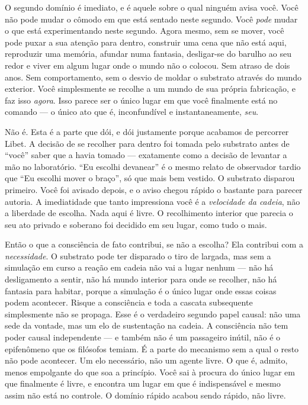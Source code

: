 \documentclass[11pt, twoside, openright]{book}
\begin{document}
O segundo domínio é imediato, e é aquele sobre o qual ninguém avisa você. Você não pode mudar o cômodo em que está sentado neste segundo. Você \textit{pode} mudar o que está experimentando neste segundo. Agora mesmo, sem se mover, você pode puxar a sua atenção para dentro, construir uma cena que não está aqui, reproduzir uma memória, afundar numa fantasia, desligar-se do barulho ao seu redor e viver em algum lugar onde o mundo não o colocou. Sem atraso de dois anos. Sem comportamento, sem o desvio de moldar o substrato através do mundo exterior. Você simplesmente se recolhe a um mundo de sua própria fabricação, e faz isso \textit{agora}. Isso parece ser o único lugar em que você finalmente está no comando --- o único ato que é, inconfundível e instantaneamente, \textit{seu}.

Não é. Esta é a parte que dói, e dói justamente porque acabamos de percorrer Libet. A decisão de se recolher para dentro foi tomada pelo substrato antes de ``você'' saber que a havia tomado --- exatamente como a decisão de levantar a mão no laboratório. ``Eu escolhi devanear'' é o mesmo relato de observador tardio que ``Eu escolhi mover o braço'', só que mais bem vestido. O substrato disparou primeiro. Você foi avisado depois, e o aviso chegou rápido o bastante para parecer autoria. A imediatidade que tanto impressiona você é a \textit{velocidade da cadeia}, não a liberdade de escolha. Nada aqui é livre. O recolhimento interior que parecia o seu ato privado e soberano foi decidido em seu lugar, como tudo o mais.

Então o que a consciência de fato contribui, se não a escolha? Ela contribui com a \textit{necessidade}. O substrato pode ter disparado o tiro de largada, mas sem a simulação em curso a reação em cadeia não vai a lugar nenhum --- não há desligamento a sentir, não há mundo interior para onde se recolher, não há fantasia para habitar, porque a simulação é o único lugar onde essas coisas podem acontecer. Risque a consciência e toda a cascata subsequente simplesmente não se propaga. Esse é o verdadeiro segundo papel causal: não uma sede da vontade, mas um elo de sustentação na cadeia. A consciência não tem poder causal independente --- e também não é um passageiro inútil, não é o epifenômeno que os filósofos temiam. É a parte do mecanismo sem a qual o resto não pode acontecer. Um elo necessário, não um agente livre. O que é, admito, menos empolgante do que soa a princípio. Você sai à procura do único lugar em que finalmente é livre, e encontra um lugar em que é indispensável e mesmo assim não está no controle. O domínio rápido acabou sendo rápido, não livre.
\end{document}

